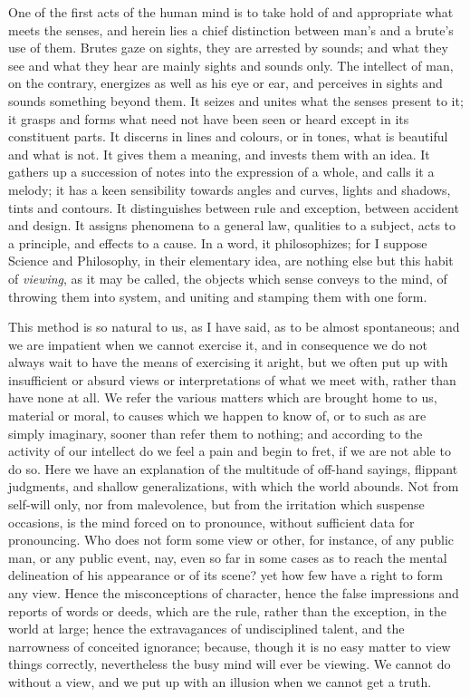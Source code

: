 One of the first acts of the human mind is to take hold of and
appropriate what meets the senses, and herein lies a chief distinction
between man's and a brute's use of them. Brutes gaze on sights, they
are arrested by sounds; and what they see and what they hear are
mainly sights and sounds only. The intellect of man, on the contrary,
energizes as well as his eye or ear, and perceives in sights and
sounds something beyond them. It seizes and unites what the
senses present to it; it grasps and forms what need not have been seen
or heard except in its constituent parts. It discerns in lines and
colours, or in tones, what is beautiful and what is not. It gives them
a meaning, and invests them with an idea. It gathers up a succession
of notes into the expression of a whole, and calls it a melody; it has
a keen sensibility towards angles and curves, lights and shadows,
tints and contours. It distinguishes between rule and exception,
between accident and design. It assigns phenomena to a general law,
qualities to a subject, acts to a principle, and effects to a cause.
In a word, it philosophizes; for I suppose Science and Philosophy, in
their elementary idea, are nothing else but this habit of \emph{viewing},
as it may be called, the objects which sense conveys to the mind, of
throwing them into system, and uniting and stamping them with one
form.

This method is so natural to us, as I have said, as to be almost
spontaneous; and we are impatient when we cannot exercise it, and in
consequence we do not always wait to have the means of exercising it
aright, but we often put up with insufficient or absurd views or
interpretations of what we meet with, rather than have none at all. We
refer the various matters which are brought home to us, material or
moral, to causes which we happen to know of, or to such as are simply
imaginary, sooner than refer them to nothing; and according to the
activity of our intellect do we feel a pain and begin to fret, if we
are not able to do so. Here we have an explanation of the multitude of
off-hand sayings, flippant judgments, and shallow generalizations,
with which the world abounds. Not from self-will only, nor from
malevolence, but from the irritation which suspense occasions, is the
mind forced on to pronounce, without sufficient data for pronouncing. Who does not form some view or other, for instance, of
any public man, or any public event, nay, even so far in some cases as
to reach the mental delineation of his appearance or of its scene? yet
how few have a right to form any view. Hence the misconceptions of
character, hence the false impressions and reports of words or deeds,
which are the rule, rather than the exception, in the world at large;
hence the extravagances of undisciplined talent, and the narrowness of
conceited ignorance; because, though it is no easy matter to view
things correctly, nevertheless the busy mind will ever be viewing. We
cannot do without a view, and we put up with an illusion when we
cannot get a truth.

